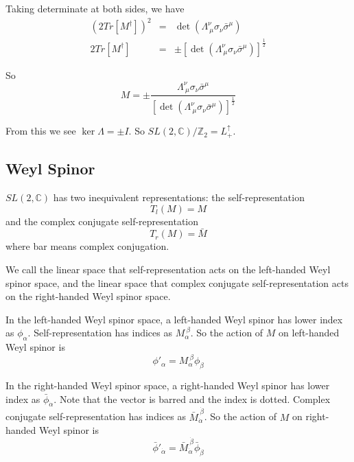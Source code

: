 \documentclass[12pt]{book}
\begin{document}
	Taking determinate at both sides, we have
	\begin{eqnarray}
		(2Tr[M^\dagger])^2&=&\det(\Lambda_{\ \mu}^\nu\sigma_\nu \bar\sigma^\mu)\\
		2Tr[M^\dagger]&=&\pm[\det(\Lambda_{\ \mu}^\nu\sigma_\nu \bar\sigma^\mu)]^{\frac 12}
	\end{eqnarray}
	
	So
	\begin{equation}
		M=\pm\frac{\Lambda_{\ \mu}^\nu\sigma_\nu \bar\sigma^\mu}{[\det(\Lambda_{\ \mu}^\nu\sigma_\nu \bar\sigma^\mu)]^{\frac 12}}
	\end{equation}
		
	From this we see $\ker \Lambda=\pm I$. So $SL(2,\mathbb C)/\mathbb Z_2=L_+^\uparrow$.
	
	\subsection{Weyl Spinor}
	
	$SL(2,\mathbb C)$ has two inequivalent representations: the self-representation
	\begin{equation}
		T_l(M)=M
	\end{equation}
	and the complex conjugate self-representation
	\begin{equation}
		T_r(M)=\bar M
	\end{equation}
	where bar means complex conjugation.
	
	We call the linear space that self-representation acts on the left-handed Weyl spinor space, and the linear space that complex conjugate self-representation acts on the right-handed Weyl spinor space.
	
	In the left-handed Weyl spinor space, a left-handed Weyl spinor has lower index as $\phi_\alpha$. Self-representation has indices as $M_\alpha^{\ \beta}$. So the action of $M$ on left-handed Weyl spinor is 
	\begin{equation}
		\phi'_\alpha=M_\alpha^{\ \beta}\phi_\beta
	\end{equation}
	
	In the right-handed Weyl spinor space, a right-handed Weyl spinor has lower index as $\bar\phi_{\dot\alpha}$. Note that the vector is barred and the index is dotted. Complex conjugate self-representation has indices as $\bar M_{\dot\alpha}^{\ \dot\beta}$. So the action of $M$ on right-handed Weyl spinor is 
	\begin{equation}
		\bar\phi'_{\dot\alpha}=\bar M_{\dot\alpha}^{\ \dot\beta}\bar\phi_{\dot\beta}
	\end{equation}
	
\end{document}
